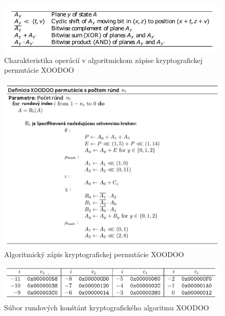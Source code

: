 \begin{figure}[!h]
	\centering
	\includegraphics[width=1.0\textwidth]{figures/tab1}
	\caption{Charakteristika operácií v algoritmickom zápise kryptografickej permutácie XOODOO \cite{xcb}}
	\label{tab1}
\end{figure}

\begin{figure}[h!]
  	\centering
  	\includegraphics[width=1.0\textwidth]{figures/xoodooalgo}
  	\caption{Algoritmický zápis kryptografickej permutácie XOODOO \cite{xcb}}
  	\label{xoodooalgo}
\end{figure}

\begin{figure}[h!]
	\centering
	\includegraphics[width=1.0\textwidth]{figures/tab2}
	\caption{Súbor rundových konštánt kryptografického algoritmu XOODOO \cite{xcb}}
	\label{tab2}
\end{figure}

